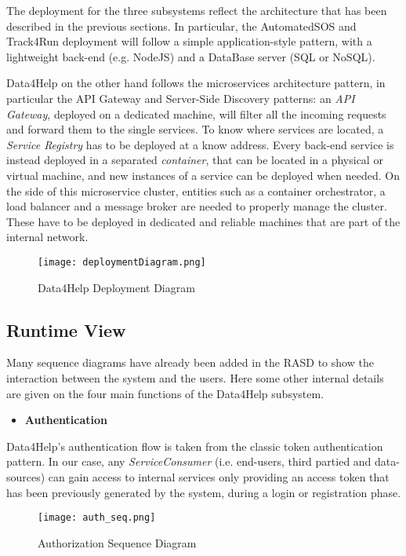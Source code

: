 The deployment for the three subsystems reflect the architecture that has been described in the previous sections. In particular, the AutomatedSOS and Track4Run deployment will follow a simple application-style pattern, with a lightweight back-end (e.g. NodeJS) and a DataBase server (SQL or NoSQL).

Data4Help on the other hand follows the microservices architecture pattern, in particular the API Gateway and Server-Side Discovery patterns: an \textit{API Gateway}, deployed on a dedicated machine, will filter all the incoming requests and forward them to the single services. To know where services are located, a \textit{Service Registry} has to be deployed at a know address. Every back-end service is instead deployed in a separated \textit{container}, that can be located in a physical or virtual machine, and new instances of a service can be deployed when needed. On the side of this microservice cluster, entities such as a container orchestrator, a load balancer and a message broker are needed to properly manage the cluster. These have to be deployed in dedicated and reliable machines that are part of the internal network.

\FloatBarrier
\begin{figure}[!h]
	\centering
	\texttt{[image: deploymentDiagram.png]}
	\caption{Data4Help Deployment Diagram}
\end{figure}
\FloatBarrier

\subsection{Runtime View}
Many sequence diagrams have already been added in the RASD to show the interaction between the system and the users. Here some other internal details are given on the four main functions of the Data4Help subsystem.

\begin{itemize}
	\item \textbf{Authentication}
\end{itemize}
Data4Help's authentication flow is taken from the classic token authentication pattern. In our case, any \textit{ServiceConsumer} (i.e. end-users, third partied and data-sources) can gain access to internal services only providing an access token that has been previously generated by the system, during a login or registration phase.

\FloatBarrier
\begin{figure}[!h]
	\centering
	\texttt{[image: auth\_seq.png]}
	\caption{Authorization Sequence Diagram}
\end{figure}
\FloatBarrier


